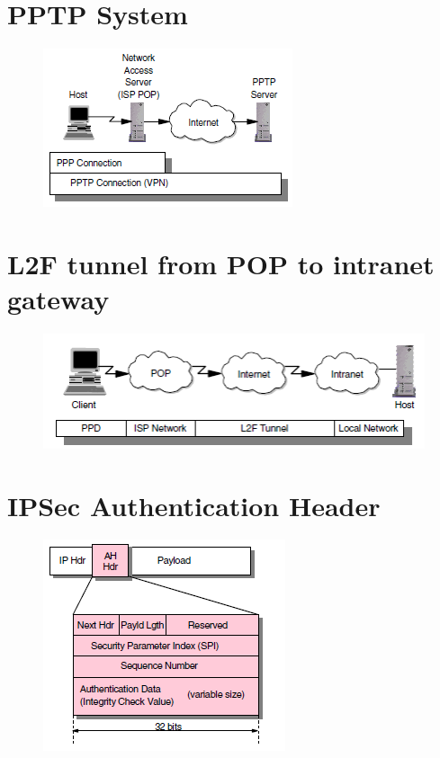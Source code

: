 \documentclass[10pt,a4paper]{article}
\begin{document}
\newpage
\section{PPTP System}

\begin{figure}[hbtp]
\centering
\includegraphics[scale=1]{PPTP system.png}
\end{figure}

\newpage
\section{L2F tunnel from POP to intranet gateway}

\begin{figure}[hbtp]
\centering
\includegraphics[scale=1]{L2F tunnel from POP to intranet gateway.png}
\end{figure}

\newpage
\section{IPSec Authentication Header}

\begin{figure}[hbtp]
\centering
\includegraphics[scale=1]{IPSecAH.png}
\end{figure}
\newpage
\end{document}
